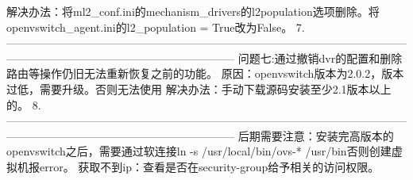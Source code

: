 \documentclass[a4paper,left=1.5cm,right=1.5cm,11pt]{article}
\begin{document}
	解决办法：将ml2_conf.ini的mechanism_drivers的l2population选项删除。将openvswitch_agent.ini的l2_population = True改为False。
7.--------------------------------------------------------------------------------------------------------------------------------------------------------------------------
	问题七:通过撤销dvr的配置和删除路由等操作仍旧无法重新恢复之前的功能。
	原因：openvswitch版本为2.0.2，版本过低，需要升级。否则无法使用	
	解决办法：手动下载源码安装至少2.1版本以上的。
8.--------------------------------------------------------------------------------------------------------------------------------------------------------------------------
	后期需要注意：安装完高版本的openvswitch之后，需要通过软连接ln -s /usr/local/bin/ovs-* /usr/bin否则创建虚拟机报error。
	获取不到ip：查看是否在security-group给予相关的访问权限。
	
\end{document}
